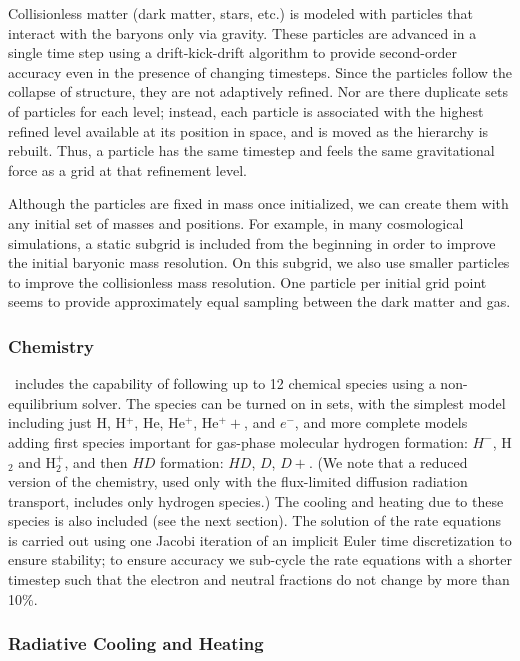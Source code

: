 Collisionless matter (dark matter, stars, etc.) is modeled with
particles that interact with the baryons only via gravity.  These
particles are advanced in a single time step using a drift-kick-drift
algorithm\citep{Hockney88} to provide second-order accuracy even in the presence of
changing timesteps.  Since the particles follow the collapse of
structure, they are not adaptively refined.  Nor are there duplicate
sets of particles for each level; instead, each particle is associated
with the highest refined level available at its position in space, and is
moved as the hierarchy is rebuilt.  Thus, a particle has the same
timestep and feels the same gravitational force as a grid at that refinement
level.

Although the particles are fixed in mass once initialized, we can
create them with any initial set of masses and positions.  For example, in
many cosmological simulations, a static subgrid is included from the
beginning in order to improve the initial baryonic mass resolution.
On this subgrid, we also use smaller particles to improve the
collisionless mass resolution.  One particle per initial grid point
seems to provide approximately equal sampling between the dark matter
and gas.

\subsubsection{Chemistry}
\label{sec.ov.chem}

\enzo\ includes the capability of following up to
12 chemical species using a non-equilibrium solver.  The species can
be turned on in sets, with the simplest model including just H, H$^+$, 
He, He$^+$, He$^++$, and $e^-$, and more complete models adding first
species important for gas-phase molecular hydrogen formation: $H^-$,
H$_2$ and H$_2^+$, and then $HD$ formation: $HD$, $D$, $D+$.  (We note
that a reduced version of the chemistry, used only with the
flux-limited diffusion radiation transport, includes only hydrogen
species.)  The
cooling and heating due to these species is also included (see the
next section).  The solution of the rate equations is carried out
using one Jacobi iteration of an implicit Euler time discretization to
ensure stability; to
ensure accuracy we sub-cycle the rate equations with a shorter
timestep such that the electron and neutral fractions do not change by
more than 10\%.

\subsubsection{Radiative Cooling and Heating}

